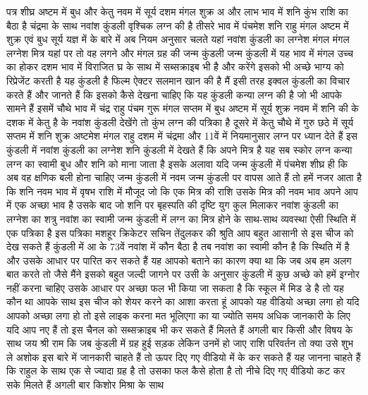 पत्र शीघ्र अष्टम में बुध और केतु नवम में सूर्य दशम
मंगल शुक्र अ और लाभ भाव में शनि कुंभ राशि का बैठा है चंद्रमा के साथ नवांश कुंडली वृश्चिक लग्न की है तीसरे भाव में
पंचमेश शनि राहु मंगल अष्टम में शुक्र एवं बुध सूर्य यज्ञ में के बारे में अब नियम
अनुसार चलते यहां नवांश कुंडली का लग्नेश मंगल मंगल लग्नेश मित्र यहां पर तो वह
लगने और मंगल ग्रह की जन्म कुंडली जन्म
कुंडली में यह भाव में मंगल उच्च का होकर दशम भाव में विराजित घ्र के साथ में
सब्सक्राइब भी है और करेंगे इसको भी अच्छे भाग्य को रिप्रेजेंट करती है यह
कुंडली है फिल्म ऐक्टर सलमान खान की है मैं इसी तरह इक्वल कुंडली का विचार करते हैं और जानते हैं कि इसको कैसे देखना
चाहिए कि यह कुंडली कन्या लग्न की है जो भी आपके सामने हैं इसमें चौथे भाव में चंद्र राहु
पंचम गुरू मंगल सप्तम में बुध अष्टम में सूर्य शुक्र नवम में शनि की
के दशक में केतु है के नवांश कुंडली देखेंगे तो कुंभ लग्न की पत्रिका है दूसरे में केतु चौथे में गुरु
छठे में सूर्य सप्तम में शनि शुक्र अष्टमेश मंगल राहु दशम में चंद्रमा और 11वें में नियमानुसार लग्न पर ध्यान देते
हैं इस कुंडली में नवांश कुंडली का लग्नेश शनि कुंडली में देखते हैं कि अपने मित्र
है यह सब स्कोर लग्न कन्या लग्न का स्वामी बुध और शनि को माना जाता है इसके अलावा
यदि जन्म कुंडली में पंचमेश शीघ्र ही
कि अब वह क्षणिक बली होना चाहिए जन्म कुंडली में नवम जन्म कुंडली पर वापस आते हैं तो हमें नजर आता है कि शनि नवम भाव
में वृषभ राशि में मौजूद जो कि एक मित्र की राशि उसके मित्र की नवम भाव अपने आप
में एक अच्छा भाव है उसके बाद जो शनि पर बृहस्पति की दृष्टि युग कुल मिलाकर नवांश
कुंडली का लग्नेश का शत्रु नवांश का स्वामी जन्म कुंडली में लग्न का मित्र होने के साथ-साथ व्यवस्था ऐसी स्थिति में
एक पत्रिका है इस पत्रिका मशहूर क्रिकेटर
सचिन तेंदुलकर की श्रुति आप बहुत आसानी से इस चीज को देख सकते हैं कुंडली में आ के 73वें नवांश में
कौन बैठा है तब नवांश का स्वामी कौन है कि स्थिति में है और उसके आधार पर पारित कर सकते हैं यह आपको बताने का कारण क्या था
कि जब अब हम अलग बात करते तो जैसे मैंने
इसको बहुत जल्दी जागने पर उसी के अनुसार
कुंडली में कुछ अच्छे को हमें इग्नोर नहीं करना चाहिए उसके आधार पर अच्छा फल भी किया
जा सकता है कि स्कूल में मिड डे है तो यह कौन था आपके साथ इस चीज को शेयर करने का आशा करता हूं आपको यह वीडियो
अच्छा लगा हो यदि आपको अच्छा लगा हो तो इसे लाइक करना मत भूलिएगा का या ज्योति समय अधिक जानकारी के लिए यदि आप नए हैं तो
इस चैनल को सब्सक्राइब भी कर सकते हैं मिलते हैं अगली बार किसी और विषय के साथ जय श्री राम
कि जब कुंडली में ग्रह हुई सड़क लेकिन उनमें हो जाए राशि परिवर्तन तो क्या उसे शुभ ले अशोक इस बारे में जानकारी चाहते
हैं तो ऊपर दिए गए वीडियो में के कर सकते हैं यह जानना चाहते हैं कि राहुल के साथ एक से ज्यादा ग्रह है तो उसका फल कैसे
होता है तो नीचे दिए गए वीडियो कट कर सके मिलते हैं अगली बार किशोर मिश्रा के साथ

